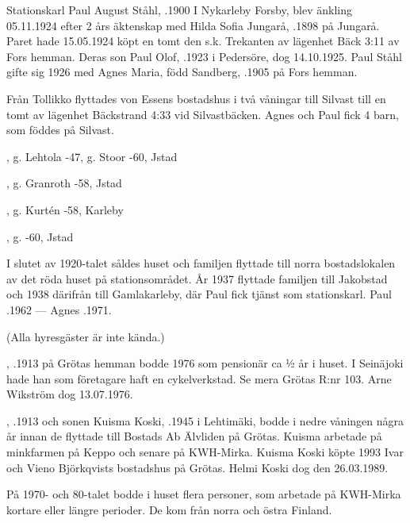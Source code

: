 Stationskarl Paul August Ståhl, .1900 I Nykarleby Forsby, blev änkling 05.11.1924 efter 2 års äktenskap med Hilda Sofia Jungarå, .1898 på Jungarå. Paret hade 15.05.1924	köpt en tomt den s.k. Trekanten av lägenhet Bäck 3:11 av Fors hemman. Deras son Paul Olof, .1923 i Pedersöre, dog 14.10.1925.	Paul Ståhl gifte sig 1926 med Agnes Maria, född Sandberg, .1905 på Fors hemman.

Från Tollikko flyttades von Essens bostadshus i två våningar till	Silvast till en tomt av lägenhet Bäckstrand 4:33 vid Silvastbäcken. Agnes och Paul fick 4 barn, som föddes på Silvast.
\begin{jhchildren}
  \item {}, g. Lehtola -47, g. Stoor -60, Jstad
  \item {}, g. Granroth -58, Jstad
  \item {}, g. Kurtén -58, Karleby
  \item {}, g. -60, Jstad
\end{jhchildren}
I slutet av 1920-talet såldes huset och familjen flyttade till norra bostadslokalen av det röda huset på stationsområdet. År 1937 flyttade 	familjen till Jakobstad och 1938 därifrån till Gamlakarleby, där Paul fick tjänst som stationskarl.  Paul .1962  ---  Agnes .1971.


  (Alla hyresgäster är inte kända.)

, .1913 på Grötas hemman bodde 1976 som pensionär ca ½ år i huset. I Seinäjoki hade han som företagare haft en cykelverkstad. Se mera Grötas R:nr 103. Arne Wikström dog 13.07.1976.

, .1913 och sonen Kuisma Koski, .1945 i Lehtimäki,	bodde i nedre våningen några år innan de flyttade till Bostads Ab Älvliden på Grötas. Kuisma arbetade på minkfarmen på Keppo och senare på KWH-Mirka. Kuisma Koski köpte 	1993 Ivar och Vieno Björkqvists bostadshus på Grötas. Helmi Koski dog den 26.03.1989.

På 1970- och 80-talet bodde i huset flera personer, som arbetade på KWH-Mirka kortare eller längre perioder. De kom från norra och östra	Finland.

